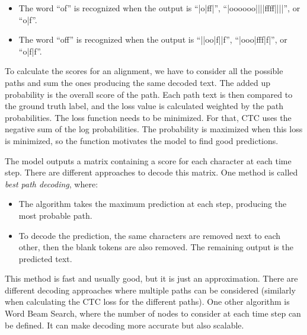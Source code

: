 \begin{itemize}
\item The word ``of'' is recognized when the output is ``|o|ff|'', ``|oooooo||||ffff||||'', or ``o|f''.
\item The word ``off'' is recognized when the output is ``||oo|f||f'', ``|ooo|fff|f|'', or ``o|f|f''.
\end{itemize}

To calculate the scores for an alignment, we have to consider all the possible paths and sum the ones producing the same decoded text. The added up probability is the overall score of the path. Each path text is then compared to the ground truth label, and the loss value is calculated weighted by the path probabilities. The loss function needs to be minimized. For that, CTC uses the negative sum of the log probabilities. The probability is maximized when this loss is minimized, so the function motivates the model to find good predictions.

The model outputs a matrix containing a score for each character at each time step. There are different approaches to decode this matrix. One method is called \textit{best path decoding}, where:

\begin{itemize}
\item The algorithm takes the maximum prediction at each step, producing the most probable path.
\item To decode the prediction, the same characters are removed next to each other, then the blank tokens are also removed. The remaining output is the predicted text.
\end{itemize}

This method is fast and usually good, but it is just an approximation. There are different decoding approaches where multiple paths can be considered (similarly when calculating the CTC loss for the different paths). One other algorithm is Word Beam Search\cite{WordBeamSearch}, where the number of nodes to consider at each time step can be defined. It can make decoding more accurate but also scalable.
